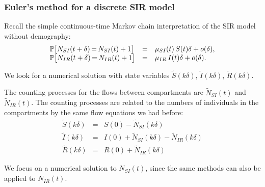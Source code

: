 \documentclass{beamer}\usepackage[]{graphicx}\usepackage[]{color}
\begin{document}
\begin{frame}[fragile]

\frametitle{Euler's method for a discrete SIR model}

\bi

\item Recall the simple continuous-time Markov chain interpretation of the SIR model without demography:
$$\begin{array}{lcl}
\mathbb{P}\big[N_{SI}(t+\delta){ \, = \, } N_{SI}(t)+1\big] &=& \mu_{SI}(t) \, S(t) \delta + o(\delta),
\\
\mathbb{P}\big[N_{IR}(t+\delta){ \, = \, } N_{IR}(t)+1\big] &=& \mu_{IR} \, I(t) \delta + o(\delta).
\end{array}$$

\item We look for a numerical solution with state variables $\tilde S(k\delta)$, $\tilde I(k\delta)$, $\tilde R(k\delta)$. 

\item The counting processes for the flows between compartments are $\tilde N_{SI}(t)$ and $\tilde N_{IR}(t)$. The counting processes are related to the numbers of individuals in the compartments by the same flow equations we had before:
$$\begin{array}{lcl} 
\tilde S(k\delta)&=& S(0) - \tilde N_{SI}(k\delta)
\\
\tilde I(k\delta)&=& I(0) + \tilde N_{SI}(k\delta) - \tilde N_{IR}(k\delta)
\\
\tilde R(k\delta) &=& R(0) + \tilde N_{IR}(k\delta)
\end{array}$$

\item We focus on a numerical solution to $N_{SI}(t)$, since the same methods can also be applied to $N_{IR}(t)$.

\ei

\end{frame}
\end{document}

